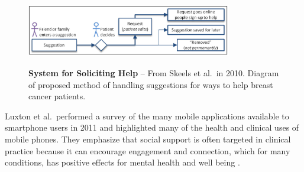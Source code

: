       \begin{figure}
      \caption[Skeels et al.\ help request system]
      {\textbf{System for Soliciting Help} --
      From Skeels et al.\ in 2010. Diagram of proposed method of handling suggestions for ways
      to help breast cancer patients.
      }
      \centering
      \includegraphics[width=0.80\textwidth]{skeels.png}
      \label{fig:skeels_diagram}
      \end{figure}

    Luxton et al.\ performed a survey of the many mobile applications available
    to smartphone users in 2011 and
    highlighted many of the health and clinical uses of mobile phones.
    They emphasize that social support is often targeted in clinical practice because
    it can encourage engagement and connection,
    which for many conditions, has positive effects for mental health and well being
    \cite{luxton11}.
